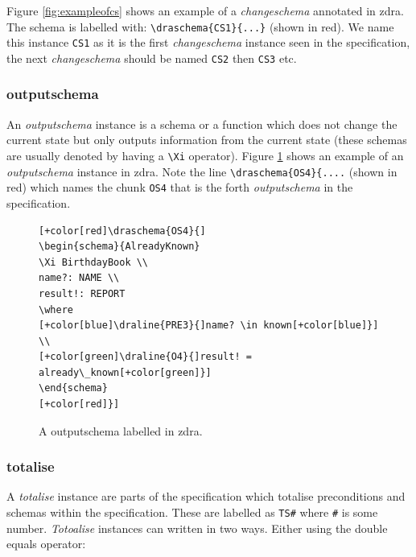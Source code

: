 Figure \ref{fig:exampleofcs} shows an example of a \emph{changeschema} annotated in \gls{zdra}. The schema is labelled with: \verb|\draschema{CS1}{...}| (shown in red). We name this instance \verb|CS1| as it is the first \emph{changeschema} instance seen in the specification, the next \emph{changeschema} should be named \verb|CS2| then \verb|CS3| etc.

\subsubsection{outputschema}

An \emph{outputschema} instance is a schema or a function which does not change the current state but only outputs information from the current state (these schemas are usually denoted by having a \verb|\Xi| operator). Figure \ref{fig:exampleofos} shows an example of an \emph{outputschema} instance in \gls{zdra}. Note the line \verb|\draschema{OS4}{....| (shown in red) which names the chunk \verb|OS4| that is the forth \emph{outputschema} in the specification.

\begin{figure}[H]
\centering
\begin{footnotesize}
\begin{BVerbatim}[commandchars=+\[\]]
[+color[red]\draschema{OS4}{]
\begin{schema}{AlreadyKnown}
\Xi BirthdayBook \\
name?: NAME \\
result!: REPORT
\where
[+color[blue]\draline{PRE3}{]name? \in known[+color[blue]}] \\
[+color[green]\draline{O4}{]result! = already\_known[+color[green]}]
\end{schema}
[+color[red]}]
\end{BVerbatim}
\end{footnotesize}
\caption{\label{fig:exampleofos} A outputschema labelled in \gls{zdra}.}
\end{figure}

\subsubsection{totalise}

A \emph{totalise} instance are parts of the specification which totalise preconditions and schemas within the specification. These are labelled as \verb|TS#| where \verb|#| is some number. \emph{Totoalise} instances can written in two ways. Either using the double equals operator:

